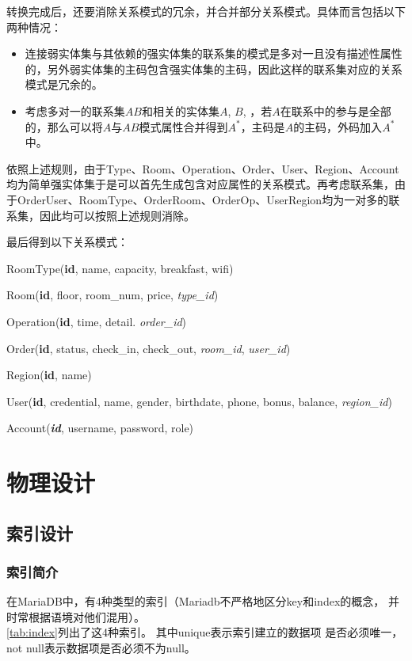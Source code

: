 \documentclass{myreport}
\begin{document}
转换完成后，还要消除关系模式的冗余，并合并部分关系模式。具体而言包括以下两种情况：

\begin{itemize}
	\item 连接弱实体集与其依赖的强实体集的联系集的模式是多对一且没有描述性属性的，另外弱实体集的主码包含强实体集的主码，因此这样的联系集对应的关系模式是冗余的。
	\item 考虑多对一的联系集$AB$和相关的实体集$A$, $B$, ，若$A$在联系中的参与是全部的，那么可以将$A$与$AB$模式属性合并得到$A^*$，主码是$A$的主码，外码加入$A^*$中。
\end{itemize}

依照上述规则，由于Type、Room、Operation、Order、User、Region、Account均为简单强实体集于是可以首先生成包含对应属性的关系模式。再考虑联系集，由于OrderUser、RoomType、OrderRoom、OrderOp、UserRegion均为一对多的联系集，因此均可以按照上述规则消除。

最后得到以下关系模式：

RoomType(\textbf{id}, name, capacity, breakfast, wifi)

Room(\textbf{id}, floor, room\_num, price, \textit{type\_id})

Operation(\textbf{id}, time, detail. \textit{order\_id})

Order(\textbf{id}, status, check\_in, check\_out, \textit{room\_id}, \textit{user\_id})

Region(\textbf{id}, name)

User(\textbf{id}, credential, name, gender, birthdate, phone, bonus, balance, \textit{region\_id})

Account(\textit{\textbf{id}}, username, password, role)


\section{物理设计}
\subsection{索引设计}
\subsubsection{索引简介}
在MariaDB中，有4种类型的索引（Mariadb不严格地区分key和index的概念，
并时常根据语境对他们混用）。\\

\autoref{tab:index}列出了这4种索引。 其中unique表示索引建立的数据项
是否必须唯一，not null表示数据项是否必须不为null。\\
\end{document}
